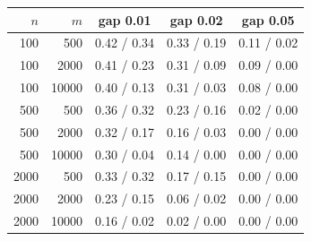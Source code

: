 \begin{tabular}{rrccc}\toprule
$n$ & $m$ & gap 0.01 & gap 0.02 & gap 0.05\\\midrule
100 & 500 & 0.42 / 0.34 & 0.33 / 0.19 & 0.11 / 0.02\\
100 & 2000 & 0.41 / 0.23 & 0.31 / 0.09 & 0.09 / 0.00\\
100 & 10000 & 0.40 / 0.13 & 0.31 / 0.03 & 0.08 / 0.00\\
500 & 500 & 0.36 / 0.32 & 0.23 / 0.16 & 0.02 / 0.00\\
500 & 2000 & 0.32 / 0.17 & 0.16 / 0.03 & 0.00 / 0.00\\
500 & 10000 & 0.30 / 0.04 & 0.14 / 0.00 & 0.00 / 0.00\\
2000 & 500 & 0.33 / 0.32 & 0.17 / 0.15 & 0.00 / 0.00\\
2000 & 2000 & 0.23 / 0.15 & 0.06 / 0.02 & 0.00 / 0.00\\
2000 & 10000 & 0.16 / 0.02 & 0.02 / 0.00 & 0.00 / 0.00\\
\bottomrule\end{tabular}
